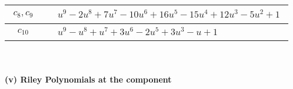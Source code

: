 \documentclass[1p]{elsarticle_modified}
\theoremstyle{definition}
\begin{document}
\begin{tabular}{m{50pt}|m{274pt}}
\hline $$\begin{aligned}c_{8},c_{9}\end{aligned}$$&$\begin{aligned}
&u^9-2 u^8+7 u^7-10 u^6+16 u^5-15 u^4+12 u^3-5 u^2+1
\end{aligned}$\\
\hline $$\begin{aligned}c_{10}\end{aligned}$$&$\begin{aligned}
&u^9- u^8+u^7+3 u^6-2 u^5+3 u^3- u+1
\end{aligned}$\\
\hline
\end{tabular}\\~\\
\newpage\renewcommand{\arraystretch}{1}
\flushleft \textbf{(v) Riley Polynomials at the component}\newline \\
\end{document}
